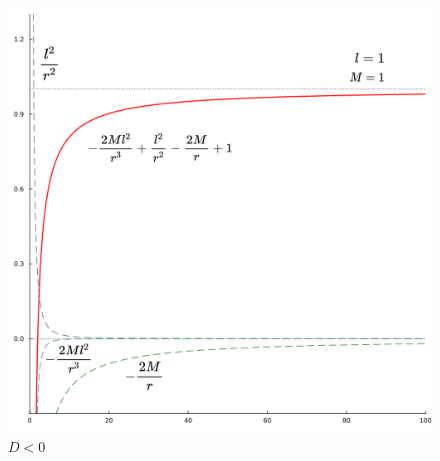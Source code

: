 \documentclass[dvipdfmx]{report} %
\begin{document}
\begin{figure}[H]
    \centering
    \includegraphics[width=0.5\columnwidth]{./images/schwarzschild/03.png}
    \caption{$D<0$}
    \label{03}
\end{figure}
\end{document}
